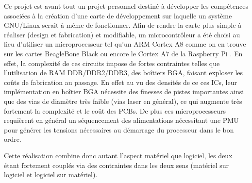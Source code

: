 Ce projet est avant tout un projet personnel destiné à développer les compétences associées à la création d'une carte de développement sur laquelle un système GNU/Linux serait à même de fonctionner.
Afin de rendre la carte plus simple à réaliser (design et fabrication) et modifiable, un microcontrôleur a été choisi au lieu d'utiliser un microprocesseur tel qu'un ARM Cortex A8 comme on en trouve sur les cartes BeagleBone Black \autocite{BeagleBoneBlack} ou encore le Cortex A7 de la Raspberry Pi \autocite{RaspberryPi}.
En effet, la complexité de ces circuits impose de fortes contraintes telles que l'utilisation de RAM DDR/DDR2/DDR3, des boîtiers BGA, faisant exploser les coûts de fabrication au passage.
En effet au vu des densités de ce ces \glspl{IC}, leur implémentation en boîtier BGA nécessite des finesses de pistes importantes ainsi que des vias de diamètre très faible (vias laser en général), ce qui augmente très fortement la complexité et le coût des \glspl{PCB}.
De plus ces microprocesseurs requièrent en général un séquencement des alimentations nécessitant une \gls{PMU} pour générer les tensions nécessaires au démarrage du processeur dans le bon ordre. 
    
Cette réalisation combine donc autant l'aspect matériel que logiciel, les deux étant fortement couplés via des contraintes dans les deux sens (matériel sur logiciel et logiciel sur matériel).
